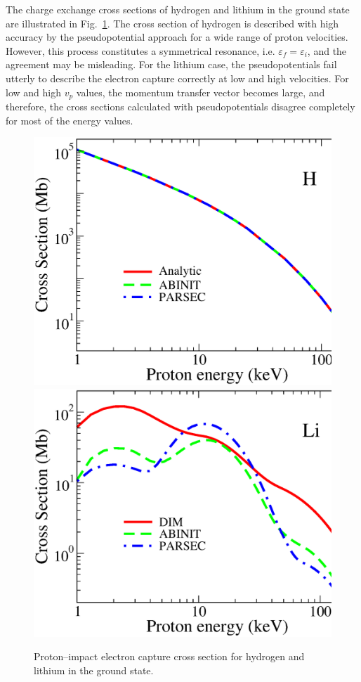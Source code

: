 \documentclass[10pt]{article}
\begin{document}
The charge exchange cross sections of hydrogen and lithium in the 
ground state are illustrated in Fig.~\ref{fig:captureH}. The cross 
section of hydrogen is described with high accuracy by the 
pseudopotential approach for a wide range of proton velocities. 
However, this process constitutes a symmetrical resonance, i.e. 
$\varepsilon_{\!f}=\varepsilon_{\!i}$, and the agreement may be 
misleading. For the lithium case, the pseudopotentials fail utterly 
to describe the electron capture correctly at low and high velocities.
For low and high $v_p$ values, the momentum transfer vector becomes 
large, and therefore, the cross sections calculated with 
pseudopotentials disagree completely for most of the energy values.
\begin{figure}[H]
\centering
 \includegraphics[height=0.23\textheight]{figures/pseudopot/captureH.eps}
 \hspace{0.3cm}
 \includegraphics[height=0.23\textheight]{figures/pseudopot/captureLi.eps}
 \caption{Proton--impact electron capture cross section for hydrogen 
 and lithium in the ground state.}
 \label{fig:captureH}
\end{figure}
\end{document}
